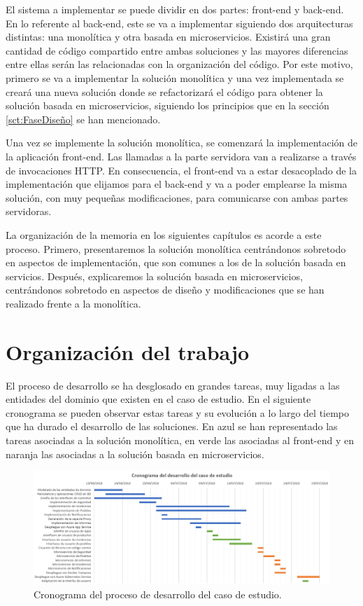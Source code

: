 \documentclass[11pt,spanish,listoffigures]{tfgetsinf}
\begin{document}
El sistema a implementar se puede dividir en dos partes: front-end y back-end. En lo referente al back-end, este se va a implementar siguiendo dos arquitecturas distintas: una monolítica y otra basada en microservicios. Existirá una gran cantidad de código compartido entre ambas soluciones y las mayores diferencias entre ellas serán las relacionadas con la organización del código. Por este motivo, primero se va a implementar la solución monolítica y una vez implementada se creará una nueva solución donde se refactorizará el código para obtener la solución basada en microservicios, siguiendo los principios que en la sección \ref{sct:FaseDiseño}  se han mencionado.

Una vez se implemente la solución monolítica, se comenzará la implementación de la aplicación front-end. Las llamadas a la parte servidora van a realizarse a través de invocaciones HTTP. En consecuencia, el front-end va a estar desacoplado de la implementación que elijamos para el back-end y va a poder emplearse la misma solución, con muy pequeñas modificaciones, para comunicarse con ambas partes servidoras.

La organización de la memoria en los siguientes capítulos es acorde a este proceso. Primero, presentaremos la solución monolítica centrándonos sobretodo en aspectos de implementación, que son comunes a los de la solución basada en servicios. Después, explicaremos la solución basada en microservicios, centrándonos sobretodo en aspectos de diseño y modificaciones que se han realizado frente a la monolítica.

\section{Organización del trabajo}

El proceso de desarrollo se ha desglosado en grandes tareas, muy ligadas a las entidades del dominio que existen en el caso de estudio. En el siguiente cronograma se pueden observar estas tareas y su evolución a lo largo del tiempo que ha durado el desarrollo de las soluciones. En azul se han representado las tareas asociadas a la solución monolítica, en verde las asociadas al front-end y en naranja las asociadas a la solución basada en microservicios.

\begin{figure}[h]
\centering
\includegraphics[scale=0.5]{Cronograma}
\caption{Cronograma del proceso de desarrollo del caso de estudio.}
\end{figure}
\end{document}
